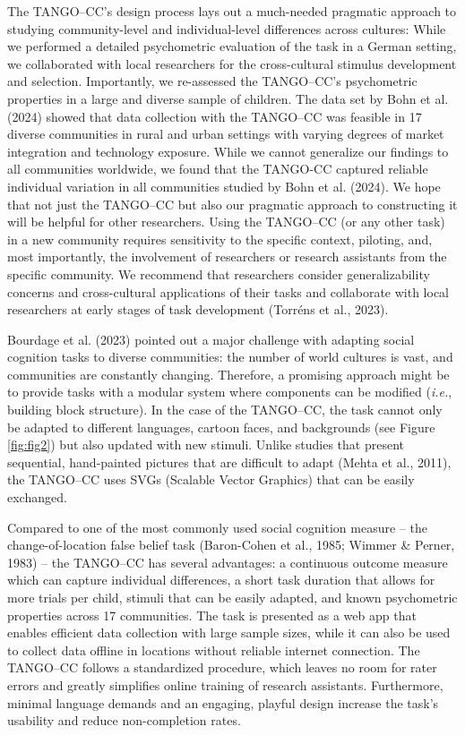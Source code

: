 \documentclass[
  man,floatsintext]{apa7}
\begin{document}
The TANGO--CC's design process lays out a much-needed pragmatic approach to studying community-level and individual-level differences across cultures:
While we performed a detailed psychometric evaluation of the task in a German setting, we collaborated with local researchers for the cross-cultural stimulus development and selection.
Importantly, we re-assessed the TANGO--CC's psychometric properties in a large and diverse sample of children.
The data set by Bohn et al. (2024) showed that data collection with the TANGO--CC was feasible in 17 diverse communities in rural and urban settings with varying degrees of market integration and technology exposure.
While we cannot generalize our findings to all communities worldwide, we found that the TANGO-CC captured reliable individual variation in all communities studied by Bohn et al. (2024).
We hope that not just the TANGO--CC but also our pragmatic approach to constructing it will be helpful for other researchers.
Using the TANGO--CC (or any other task) in a new community requires sensitivity to the specific context, piloting, and, most importantly, the involvement of researchers or research assistants from the specific community.
We recommend that researchers consider generalizability concerns and cross-cultural applications of their tasks and collaborate with local researchers at early stages of task development (Torréns et al., 2023).

Bourdage et al. (2023) pointed out a major challenge with adapting social cognition tasks to diverse communities: the number of world cultures is vast, and communities are constantly changing.
Therefore, a promising approach might be to provide tasks with a modular system where components can be modified (\emph{i.e.}, building block structure).
In the case of the TANGO--CC, the task cannot only be adapted to different languages, cartoon faces, and backgrounds (see Figure \ref{fig:fig2}) but also updated with new stimuli.
Unlike studies that present sequential, hand-painted pictures that are difficult to adapt (Mehta et al., 2011), the TANGO--CC uses SVGs (Scalable Vector Graphics) that can be easily exchanged.

Compared to one of the most commonly used social cognition measure -- the change-of-location false belief task (Baron-Cohen et al., 1985; Wimmer \& Perner, 1983) -- the TANGO--CC has several advantages: a continuous outcome measure which can capture individual differences, a short task duration that allows for more trials per child, stimuli that can be easily adapted, and known psychometric properties across 17 communities.
The task is presented as a web app that enables efficient data collection with large sample sizes, while it can also be used to collect data offline in locations without reliable internet connection.
The TANGO--CC follows a standardized procedure, which leaves no room for rater errors and greatly simplifies online training of research assistants.
Furthermore, minimal language demands and an engaging, playful design increase the task's usability and reduce non-completion rates.
\end{document}
